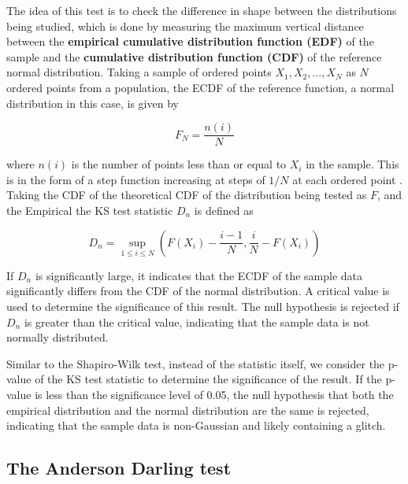 \documentclass[12pt]{article}
\begin{document}

\medskip
\noindent The idea of this test is to check the difference in shape between the distributions being studied, which is done by measuring the maximum vertical distance between the \textbf{empirical cumulative distribution function (EDF)} of the sample and the \textbf{cumulative distribution function (CDF)} of the reference normal distribution. Taking a sample of ordered points $X_1, X_2, \ldots, X_N$ as $N$ ordered points from a population, the ECDF of the reference function, a normal distribution in this case, is given by

\begin{equation}
    F_N = \frac{n(i)}{N}
    \label{eq:edf}
\end{equation}

\medskip
\noindent where $n(i)$ is the number of points less than or equal to $X_i$ in the sample. This is in the form of a step function increasing at steps of $1/N$ at each ordered point \cite{guthrie_nistsematech_2020}. Taking the CDF of the theoretical CDF of the distribution  being tested as $F$, and the Empirical the KS test statistic $D_n$ is defined as

\begin{equation}
    D_n = \sup_{1 \leq i \leq N} \left( F(X_i) - \frac{i - 1}{N} , \frac{i}{N} - F(X_i) \right)
    \label{eq:ks_statistic}
\end{equation}

\medskip
\noindent If $D_n$ is significantly large, it indicates that the ECDF of the sample data significantly differs from the CDF of the normal distribution. A critical value is used to determine the significance of this result. The null hypothesis is rejected if $D_n$ is greater than the critical value, indicating that the sample data is not normally distributed.

\medskip
\noindent Similar to the Shapiro-Wilk test, instead of the statistic itself, we consider the p-value of the KS test statistic to determine the significance of the result. If the p-value is less than the significance level of 0.05, the null hypothesis that both the empirical distribution and the normal distribution are the same is rejected, indicating that the sample data is non-Gaussian and likely containing a glitch.

\subsection{The Anderson Darling test}\label{AndersonDarling}
\end{document}
